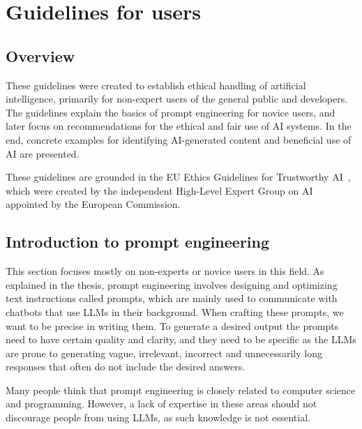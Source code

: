 \setcounter{figure}{0}
\setcounter{table}{0}
\setcounter{section}{0}
\setcounter{listing}{0}

\chapter{Guidelines for users \label{cha:guidelines}}
\renewcommand{\thepage}{B-\arabic{page}}


\begin{refsegment}
\minitoc
\clearpage

\section{Overview}
These guidelines were created to establish ethical handling of artificial intelligence, primarily for non-expert users of the general public and developers. The guidelines explain the basics of prompt engineering for novice users, and later focus on recommendations for the ethical and fair use of AI systems. In the end, concrete examples for identifying AI-generated content and beneficial use of AI are presented.

These guidelines are grounded in the EU Ethics Guidelines for Trustworthy AI~\cite{AIHLEG2019}, which were created by the independent High-Level Expert Group on AI appointed by the European Commission.

\section{Introduction to prompt engineering}
This section focuses mostly on non-experts or novice users in this field. As explained in the thesis, prompt engineering involves designing and optimizing text instructions called prompts, which are mainly used to communicate with chatbots that use LLMs in their background. When crafting these prompts, we want to be precise in writing them. To generate a desired output the prompts need to have certain quality and clarity, and they need to be specific as the LLMs are prone to generating vague, irrelevant, incorrect and unnecessarily long responses that often do not include the desired answers.

Many people think that prompt engineering is closely related to computer science and programming. However, a lack of expertise in these areas should not discourage people from using LLMs, as such knowledge is not essential.


\end{refsegment}
